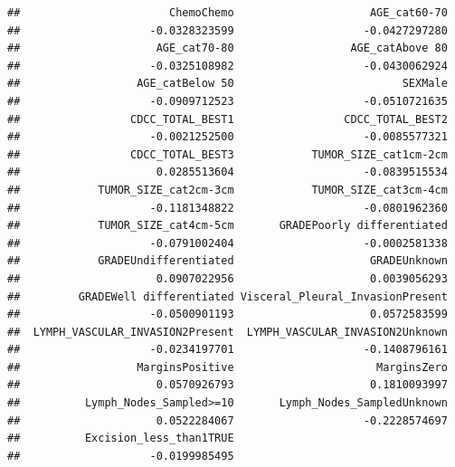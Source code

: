 \documentclass[
  11pt,
]{article}
\newenvironment{Shaded}{\begin{snugshade}}{\end{snugshade}}
\newcommand{\CommentTok}[1]{\textcolor[rgb]{0.56,0.35,0.01}{\textit{#1}}}
\newcommand{\FunctionTok}[1]{\textcolor[rgb]{0.00,0.00,0.00}{#1}}
\newcommand{\NormalTok}[1]{#1}
\newcommand{\SpecialCharTok}[1]{\textcolor[rgb]{0.00,0.00,0.00}{#1}}
\begin{document}
\begin{verbatim}
##                       ChemoChemo                     AGE_cat60-70 
##                    -0.0328323599                    -0.0427297280 
##                     AGE_cat70-80                  AGE_catAbove 80 
##                    -0.0325108982                    -0.0430062924 
##                  AGE_catBelow 50                          SEXMale 
##                    -0.0909712523                    -0.0510721635 
##                 CDCC_TOTAL_BEST1                 CDCC_TOTAL_BEST2 
##                    -0.0021252500                    -0.0085577321 
##                 CDCC_TOTAL_BEST3            TUMOR_SIZE_cat1cm-2cm 
##                     0.0285513604                    -0.0839515534 
##            TUMOR_SIZE_cat2cm-3cm            TUMOR_SIZE_cat3cm-4cm 
##                    -0.1181348822                    -0.0801962360 
##            TUMOR_SIZE_cat4cm-5cm       GRADEPoorly differentiated 
##                    -0.0791002404                    -0.0002581338 
##            GRADEUndifferentiated                     GRADEUnknown 
##                     0.0907022956                     0.0039056293 
##         GRADEWell differentiated Visceral_Pleural_InvasionPresent 
##                    -0.0500901193                     0.0572583599 
##  LYMPH_VASCULAR_INVASION2Present  LYMPH_VASCULAR_INVASION2Unknown 
##                    -0.0234197701                    -0.1408796161 
##                  MarginsPositive                      MarginsZero 
##                     0.0570926793                     0.1810093997 
##          Lymph_Nodes_Sampled>=10       Lymph_Nodes_SampledUnknown 
##                     0.0522284067                    -0.2228574697 
##          Excision_less_than1TRUE 
##                    -0.0199985495
\end{verbatim}

\begin{Shaded}
\end{Shaded}
\end{document}
